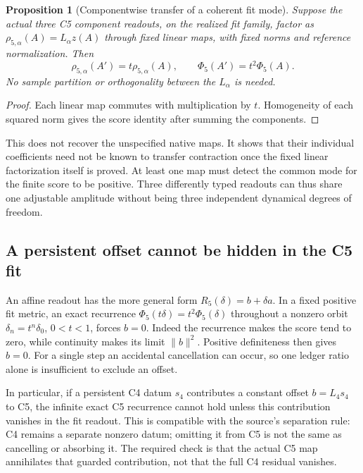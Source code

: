 \documentclass[11pt,a4paper]{article}
\newtheorem{proposition}{Proposition}
\begin{document}
\begin{proposition}[Componentwise transfer of a coherent fit mode]
\label{prop:coherent-component-transfer}
Suppose the actual three C5 component readouts, on the realized fit
family, factor as $\rho_{5,\alpha}(A)=L_\alpha z(A)$ through fixed
linear maps, with fixed norms and reference normalization. Then
\[
 \rho_{5,\alpha}(A')=t\rho_{5,\alpha}(A),\qquad
 \Phi_5(A')=t^2\Phi_5(A).
\]
No sample partition or orthogonality between the $L_\alpha$ is needed.
\end{proposition}
\begin{proof}
Each linear map commutes with multiplication by $t$. Homogeneity of
each squared norm gives the score identity after summing the components.
\end{proof}
This does not recover the unspecified native maps. It shows that their
individual coefficients need not be known to transfer contraction once
the fixed linear factorization itself is proved. At least one map must
detect the common mode for the finite score to be positive.
Three differently typed readouts can thus share one adjustable amplitude
without being three independent dynamical degrees of freedom.

\subsection{A persistent offset cannot be hidden in the C5 fit}
An affine readout has the more general form
$R_5(\delta)=b+\delta a$. In a fixed positive fit metric, an exact
recurrence $\Phi_5(t\delta)=t^2\Phi_5(\delta)$ throughout a nonzero
orbit $\delta_n=t^n\delta_0$, $0<t<1$, forces $b=0$.
Indeed the recurrence makes the score tend to zero, while continuity
makes its limit $\|b\|^2$. Positive definiteness then gives $b=0$.
For a single step an accidental cancellation can occur, so one ledger
ratio alone is insufficient to exclude an offset.

In particular, if a persistent C4 datum $s_4$ contributes a constant
offset $b=L_4s_4$ to C5, the infinite exact C5 recurrence cannot hold
unless this contribution vanishes in the fit readout. This is compatible
with the source's separation rule: C4 remains a separate nonzero datum;
omitting it from C5 is not the same as cancelling or absorbing it.
The required check is that the actual C5 map annihilates that guarded
contribution, not that the full C4 residual vanishes.
\end{document}
